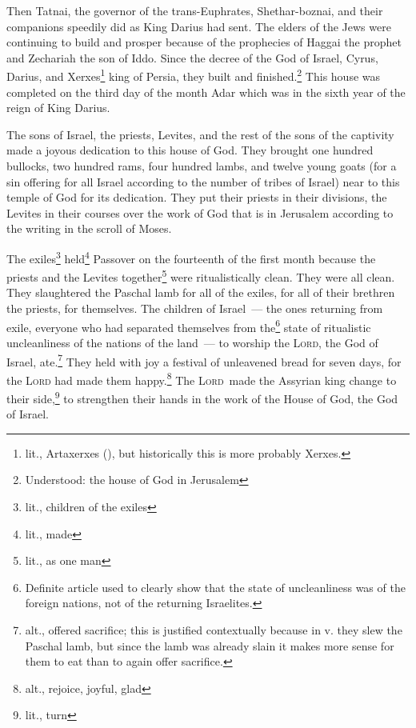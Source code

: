 \begin{inparaenum}\setcounter{enumi}{12}
     Then Tatnai, the governor of the trans-Euphrates, Shethar-boznai, and their companions speedily did as King Darius had sent.%
     The elders of the Jews were continuing to build and prosper because of the prophecies of Haggai the prophet and Zechariah the son of Iddo. Since the decree of the God of Israel, Cyrus, Darius, and Xerxes\footnote{lit., Artaxerxes (), but historically this is more probably Xerxes.} king of Persia, they built and finished.\footnote{Understood: the house of God in Jerusalem}%
     This house was completed on the third day of the month Adar which was in the sixth year of the reign of King Darius.%
    
     The sons of Israel, the priests, Levites, and the rest of the sons of the captivity made a joyous dedication to this house of God.%
     They brought one hundred bullocks, two hundred rams, four hundred lambs, and twelve young goats (for a sin offering for all Israel according to the number of tribes of Israel) near to this temple of God for its dedication.%
     They put their priests in their divisions, the Levites in their courses over the work of God that is in Jerusalem according to the writing in the scroll of Moses.%
    
     The exiles\footnote{lit., children of the exiles} held\footnote{lit., made} Passover on the fourteenth of the first month%
     because the priests and the Levites together\footnote{lit., as one man} were ritualistically clean. They were all clean. They slaughtered the Paschal lamb for all of the exiles, for all of their brethren the priests, for themselves.%
     The children of Israel~--- the ones returning from exile, everyone who had separated themselves from the\footnote{Definite article used to clearly show that the state of uncleanliness was of the foreign nations, not of the returning Israelites.} state of ritualistic uncleanliness of the nations of the land~--- to worship the \textsc{Lord}, the God of Israel, ate.\footnote{alt., offered sacrifice; this is justified contextually because in v. they slew the Paschal lamb, but since the lamb was already slain it makes more sense for them to eat than to again offer sacrifice.}%
     They held with joy a festival of unleavened bread for seven days, for the \textsc{Lord} had made them happy.\footnote{alt., rejoice, joyful, glad} The \textsc{Lord}\understood\ made the Assyrian king change to their side,\footnote{lit., turn} to strengthen their hands in the work of the House of God, the God of Israel.%
\end{inparaenum}
